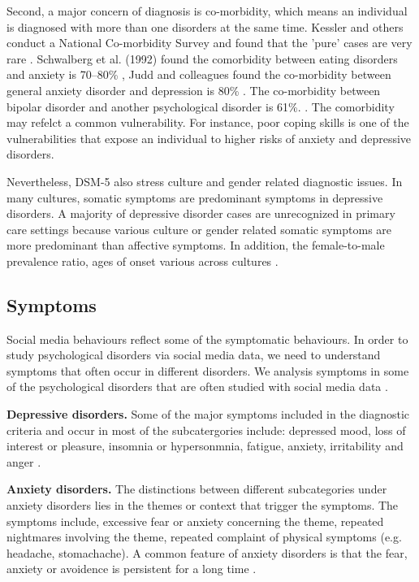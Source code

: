 Second, a major concern of diagnosis is co-morbidity, which means an individual is diagnosed with more than one disorders at the same time. Kessler and others conduct a National Co-morbidity Survey and found that the 'pure' cases are very rare \cite{kessler1994lifetime}. Schwalberg et al. (1992) found the comorbidity between eating disorders and anxiety is 70–80\% \cite{schwalberg1992comparison}, Judd and colleagues found the co-morbidity between general anxiety disorder and depression is 80\% \cite{judd1998comorbidity}. The co-morbidity between bipolar disorder and another psychological disorder is 61\%. \cite{raja2004clinical}. The comorbidity may refelct a common vulnerability. For instance, poor coping skills  \cite{andrews1996comorbidity} is one of the vulnerabilities that expose an individual to higher risks of anxiety and depressive disorders. 

Nevertheless, DSM-5 also stress culture and gender related diagnostic issues. In many cultures, somatic symptoms are predominant symptoms in depressive disorders. A majority of depressive disorder cases are unrecognized in primary care settings because various culture or gender related somatic symptoms are more predominant than affective symptoms. In addition, the female-to-male prevalence ratio, ages of onset various across cultures \cite{harvey2004cognitive}. 

\subsection{Symptoms}

Social media behaviours reflect some of the symptomatic behaviours. In order to study psychological disorders via social media data, we need to understand symptoms that often occur in different disorders. We analysis symptoms in some of the psychological disorders that are often studied with social media data \cite{american2013diagnostic}.

\textbf{Depressive disorders.} Some of the major symptoms included in the diagnostic criteria and occur in most of the subcatergories include: depressed mood, loss of interest or pleasure, insomnia or hypersonmnia, fatigue, anxiety, irritability and anger \cite{american2013diagnostic}.


\textbf{Anxiety disorders.} The distinctions between different subcategories under anxiety disorders lies in the themes or context that trigger the symptoms. The symptoms include,  excessive fear or anxiety concerning the theme, repeated nightmares involving the theme, repeated complaint of physical symptoms (e.g. headache, stomachache). A common feature of anxiety disorders is that the fear, anxiety or avoidence is persistent for a long time \cite{american2013diagnostic}.


